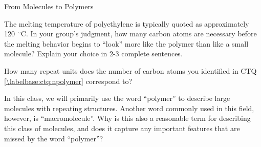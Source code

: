 \begin{activity}{From Molecules to Polymers}
\begin{ctqs}
	\question The melting temperature of polyethylene is typically quoted as approximately 120~${}^\circ$C.  In your group's judgment, how many carbon atoms are necessary before the melting behavior begins to ``look'' more like the polymer than like a small molecule?  Explain your choice in 2-3 complete sentences. \label{\labelbase:ctq:npolymer}
	
		\begin{solution}[2in]
		\end{solution}
	
	
			
\end{ctqs}

		

\begin{exercises}

	\exercise How many repeat units does the number of carbon atoms you identified in CTQ \ref{\labelbase:ctq:npolymer} correspond to?

	\exercise In this class, we will primarily use the word ``polymer'' to describe large molecules with repeating structures.  Another word commonly used in this field, however, is ``macromolecule''.  Why is this also a reasonable term for describing this class of molecules, and does it capture any important features that are missed by the word ``polymer''?
	
\end{exercises}



	


	
\end{activity}